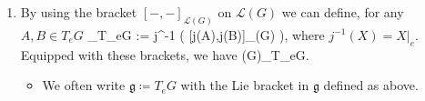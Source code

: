 \documentclass{article}
\begin{document}
\begin{enumerate}

\item {}
By using the bracket $[-,-]_{\mathcal{L}(G)}$ on $\mathcal{L}(G)$ we can define, for any $A,B\in T_eG$
\bse
[A,B]_{T_eG} := j^{-1} \bigl( [j(A),j(B)]_{(G)} \bigr),
\ese
where $j^{-1}(X)=X|_e$. Equipped with these brackets, we have
\bse
{}(G)\cong_T_eG.
\ese
\begin{itemize}
    \item {} We often write $\mathfrak{g}\coloneqq T_eG$ with the Lie bracket in $\mathfrak{g}$ defined as above. 
\end{itemize}


\end{enumerate}
\end{document}
